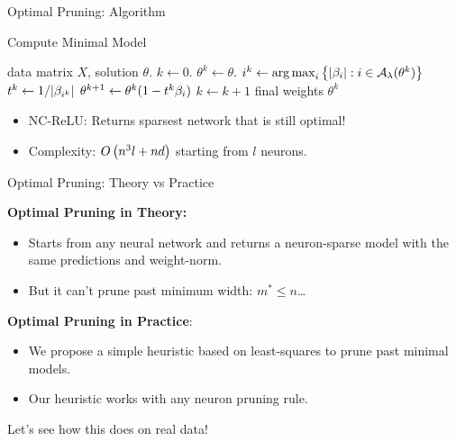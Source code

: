 \documentclass[usenames,dvipsnames,mathserif,notheorems]{beamer}
\newcommand{\bad}[1]{\textcolor{bad}{#1}}
\newcommand{\good}[1]{\textcolor{good}{#1}}
\begin{document}
\begin{frame}{Optimal Pruning: Algorithm}
	\begin{algorithm}[H]
		\caption{Compute Minimal Model}
		\begin{algorithmic}
			 data matrix \( X \), solution \( \theta \).
			\STATE \( k \gets 0 \).
			\STATE \( \theta^k \gets \theta \).
			\WHILE {\( \exists \beta \neq 0 \) s.t. \( \good{\sum_{\bi \in \act(\theta^k)} \beta_\bi D_i X \theta_i^k = 0} \)}
			\STATE \( {i}^k \gets \mathop{\rm arg\,max}_{{i}} \left\{|\beta_{i}| : {i} \in {\mathcal{A}_{\lambda}}(\theta^k)\right\}  \)
			\STATE \( t^k \gets 1/|\beta_{{i}^k}| \)
			\STATE \( \theta^{k+1} \gets \theta^k (1 - t^k \beta_{i}) \)
			\STATE \( k \gets k + 1 \)
			\ENDWHILE
			 final weights \( \theta^k \)
		\end{algorithmic}
	\end{algorithm}

	\pause
	\begin{itemize}
		\item \bad{NC-ReLU}: Returns \good{sparsest network} that is still optimal!
		      \pause
          \item Complexity: \( O\left(n^3 l + nd\right) \) starting from \( l \) neurons.
	\end{itemize}

\end{frame}

\begin{frame}{Optimal Pruning: Theory vs Practice}

	\textbf{Optimal Pruning in Theory:}
	\begin{itemize}
		\item Starts from any neural network and returns a \good{neuron-sparse} model
		      with the same \good{predictions} and \good{weight-norm}.
		      \pause

		\item But it can't prune past minimum width: \bad{\( m^* \leq n \)}\ldots
	\end{itemize}

	\vspace{2em}
	\pause

	\textbf{Optimal Pruning in Practice}:
	\begin{itemize}
		\item We propose a \good{simple heuristic} based on least-squares to prune
		      past minimal models.
		      \pause

		\item Our heuristic works with \good{any neuron pruning rule}.
	\end{itemize}

	\vspace{1em}
	\pause

	\begin{center}
		\Large
		Let's see how this does on real data!
	\end{center}

\end{frame}
\end{document}
